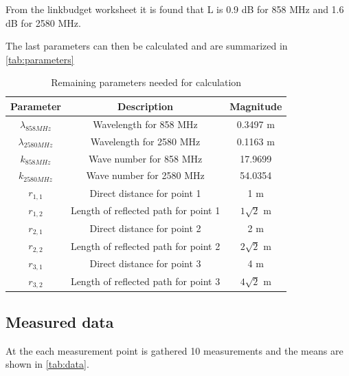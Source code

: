 From the linkbudget worksheet it is found that L is 0.9 dB for 858 MHz and 1.6 dB for 2580 MHz.

The last parameters can then be calculated and are summarized in \autoref{tab:parameters}

\begin{table}[H]
\centering
\begin{tabular}{|c|c|c|}\hline
\textbf{Parameter}	&\textbf{Description}		&\textbf{Magnitude}	\\\hline
$\lambda_{858MHz}$	& Wavelength for 858 MHz				&0.3497 m			\\\hline
$\lambda_{2580MHz}$	& Wavelength for 2580 MHz				&0.1163 m			\\\hline
$k_{858MHz}$		& Wave number for 858 MHz				&17.9699			\\\hline
$k_{2580MHz}$		& Wave number for 2580 MHz				&54.0354			\\\hline
$r_{1,1}$			& Direct distance for point 1			&1 m				\\\hline
$r_{1,2}$			& Length of reflected path  for point 1	&$1\sqrt{2}$ m		\\\hline
$r_{2,1}$			& Direct distance  for point 2			&2 m				\\\hline
$r_{2,2}$			& Length of reflected path for point 2	&$2\sqrt{2}$ m		\\\hline
$r_{3,1}$			& Direct distance  for point 3			&4 m				\\\hline
$r_{3,2}$			& Length of reflected path for point 3	&$4\sqrt{2}$ m		\\\hline
\end{tabular}
\caption{Remaining parameters needed for calculation}
\label{tab:summarized}
\end{table}

\subsection{Measured data}

At the each measurement point is gathered 10 measurements and the means are shown in \autoref{tab:data}.

